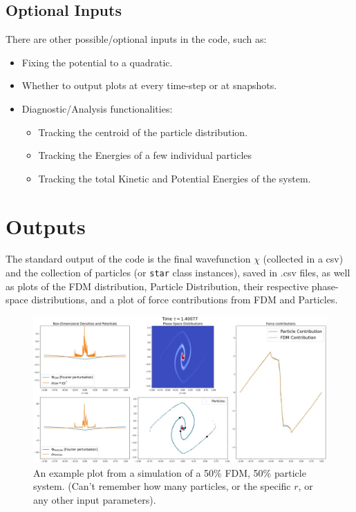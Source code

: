 \documentclass[oneside]{book}
\begin{document}
\subsection{Optional Inputs}
There are other possible/optional inputs in the code, such as: 
\begin{itemize}
    \item Fixing the potential to a quadratic.
    \item Whether to output plots at every time-step or at snapshots.
    \item Diagnostic/Analysis functionalities: 
    \begin{itemize}
        \item Tracking the centroid of the particle distribution.
        \item Tracking the Energies of a few individual particles
        \item Tracking the total Kinetic and Potential Energies of the system.
    \end{itemize}
\end{itemize}

\section{Outputs}
The standard output of the code is the final wavefunction $\chi$ (collected in a csv) and the collection of particles 
(or \texttt{star} class instances), saved in .csv files, as well as plots of the FDM distribution, Particle Distribution, 
their respective phase-space distributions, and a plot of force contributions from FDM and Particles. 

\begin{figure}[h]
    \centering
    \includegraphics[width=\textwidth]{Images/ToyModelPlot0100.jpg}
    \caption{An example plot from a simulation of a 50\% FDM, 50\% particle system. (Can't remember how many particles, or the specific $r$, or any other input parameters). }
    \label{fig:my_label}
\end{figure}
\end{document}
